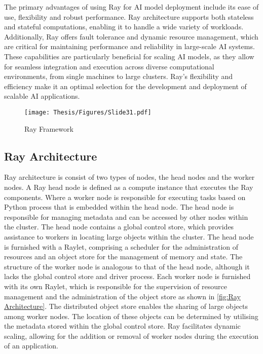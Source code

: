 The primary advantages of using Ray for AI model deployment include its ease of use, flexibility and robust performance. Ray architecture supports both stateless and stateful computations, enabling it to handle a wide variety of workloads. Additionally, Ray offers fault tolerance and dynamic resource management, which are critical for maintaining performance and reliability in large-scale AI systems. These capabilities are particularly beneficial for scaling AI models, as they allow for seamless integration and execution across diverse computational environments, from single machines to large clusters. Ray's flexibility and efficiency make it an optimal selection for the development and deployment of scalable AI applications. \cite{ray_doc}


\captionsetup{justification=centering}
\begin{figure}[h]
\centering
\texttt{[image: Thesis/Figures/Slide31.pdf]}
\caption{\label{fig:Ray Framework}Ray Framework \cite{ray_doc}}
\end{figure}


\subsection{Ray Architecture}

Ray architecture is consist of two types of nodes, the head nodes and the worker nodes. A Ray head node is defined as a compute instance that executes the Ray components. Where a worker node is responsible for executing tasks based on Python process that is embedded within the head node. The head node is responsible for managing metadata and can be accessed by other nodes within the cluster. The head node contains a global control store, which provides assistance to workers in locating large objects within the cluster. The head node is furnished with a Raylet, comprising a scheduler for the administration of resources and an object store for the management of memory and state. The structure of the worker node is analogous to that of the head node, although it lacks the global control store and driver process. Each worker node is furnished with its own Raylet, which is responsible for the supervision of resource management and the administration of the object store as shown in \autoref{fig:Ray Architecture}. The distributed object store enables the sharing of large objects among worker nodes. The location of these objects can be determined by utilising the metadata stored within the global control store. Ray facilitates dynamic scaling, allowing for the addition or removal of worker nodes during the execution of an application. \cite{r34}



